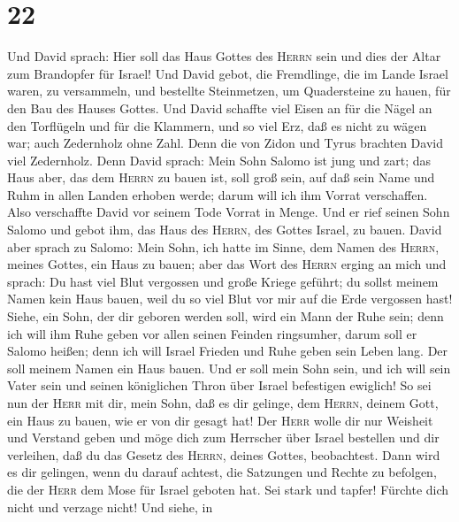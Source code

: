 \hypertarget{section-21}{%
\section{22}\label{section-21}}

 Und David sprach: Hier soll das Haus Gottes des
\textsc{Herrn} sein und dies der Altar zum Brandopfer für Israel!
 Und David gebot, die Fremdlinge, die im Lande Israel
waren, zu versammeln, und bestellte Steinmetzen, um Quadersteine zu
hauen, für den Bau des Hauses Gottes.  Und David schaffte
viel Eisen an für die Nägel an den Torflügeln und für die Klammern, und
so viel Erz, daß es nicht zu wägen war;  auch Zedernholz
ohne Zahl. Denn die von Zidon und Tyrus brachten David viel Zedernholz.
 Denn David sprach: Mein Sohn Salomo ist jung und zart;
das Haus aber, das dem \textsc{Herrn} zu bauen ist, soll groß sein, auf
daß sein Name und Ruhm in allen Landen erhoben werde; darum will ich ihm
Vorrat verschaffen. Also verschaffte David vor seinem Tode Vorrat in
Menge.  Und er rief seinen Sohn Salomo und gebot ihm, das
Haus des \textsc{Herrn}, des Gottes Israel, zu bauen. 
David aber sprach zu Salomo: Mein Sohn, ich hatte im Sinne, dem Namen
des \textsc{Herrn}, meines Gottes, ein Haus zu bauen; 
aber das Wort des \textsc{Herrn} erging an mich und sprach: Du hast viel
Blut vergossen und große Kriege geführt; du sollst meinem Namen kein
Haus bauen, weil du so viel Blut vor mir auf die Erde vergossen hast!
 Siehe, ein Sohn, der dir geboren werden soll, wird ein
Mann der Ruhe sein; denn ich will ihm Ruhe geben vor allen seinen
Feinden ringsumher, darum soll er Salomo heißen; denn ich will Israel
Frieden und Ruhe geben sein Leben lang.  Der soll meinem
Namen ein Haus bauen. Und er soll mein Sohn sein, und ich will sein
Vater sein und seinen königlichen Thron über Israel befestigen ewiglich!
 So sei nun der \textsc{Herr} mit dir, mein Sohn, daß es
dir gelinge, dem \textsc{Herrn}, deinem Gott, ein Haus zu bauen, wie er
von dir gesagt hat!  Der \textsc{Herr} wolle dir nur
Weisheit und Verstand geben und möge dich zum Herrscher über Israel
bestellen und dir verleihen, daß du das Gesetz des \textsc{Herrn},
deines Gottes, beobachtest.  Dann wird es dir gelingen,
wenn du darauf achtest, die Satzungen und Rechte zu befolgen, die der
\textsc{Herr} dem Mose für Israel geboten hat. Sei stark und tapfer!
Fürchte dich nicht und verzage nicht!  Und siehe, in
